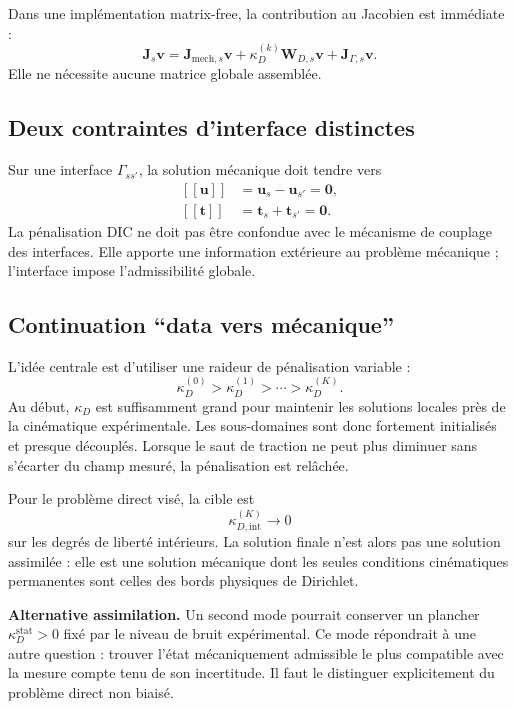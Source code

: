 \documentclass[11pt,a4paper]{article}
\newcommand{\jump}[1]{\left[\!\left[ #1 \right]\!\right]}
\begin{document}
Dans une implémentation matrix-free, la contribution au Jacobien est immédiate :
\begin{equation}
  \bm{J}_s\bm{v}
  = \bm{J}_{\mathrm{mech},s}\bm{v}
  + \kappa_D^{(k)}\bm{W}_{D,s}\bm{v}
  + \bm{J}_{\Gamma,s}\bm{v}.
\end{equation}
Elle ne nécessite aucune matrice globale assemblée.

\subsection{Deux contraintes d'interface distinctes}

Sur une interface $\Gamma_{ss'}$, la solution mécanique doit tendre vers
\begin{align}
  \jump{\bm{u}} &= \bm{u}_s-\bm{u}_{s'} = \bm{0},\\
  \jump{\bm{t}} &= \bm{t}_s+\bm{t}_{s'} = \bm{0}.
\end{align}
La pénalisation DIC ne doit pas être confondue avec le mécanisme de couplage des interfaces. Elle
apporte une information extérieure au problème mécanique ; l'interface impose l'admissibilité
globale.

\subsection{Continuation ``data vers mécanique''}

L'idée centrale est d'utiliser une raideur de pénalisation variable :
\begin{equation}
  \kappa_D^{(0)} > \kappa_D^{(1)} > \cdots > \kappa_D^{(K)}.
\end{equation}
Au début, $\kappa_D$ est suffisamment grand pour maintenir les solutions locales près de la
cinématique expérimentale. Les sous-domaines sont donc fortement initialisés et presque découplés.
Lorsque le saut de traction ne peut plus diminuer sans s'écarter du champ mesuré, la pénalisation est
relâchée.

Pour le problème direct visé, la cible est
\begin{equation}
  \boxed{\kappa_{D,\mathrm{int}}^{(K)}\rightarrow 0}
\end{equation}
sur les degrés de liberté intérieurs. La solution finale n'est alors pas une solution assimilée : elle
est une solution mécanique dont les seules conditions cinématiques permanentes sont celles des
bords physiques de Dirichlet.

\begin{methodbox}
\textbf{Alternative assimilation.} Un second mode pourrait conserver un plancher
$\kappa_D^{\mathrm{stat}}>0$ fixé par le niveau de bruit expérimental. Ce mode répondrait à une autre
question : trouver l'état mécaniquement admissible le plus compatible avec la mesure compte tenu de
son incertitude. Il faut le distinguer explicitement du problème direct non biaisé.
\end{methodbox}
\end{document}

